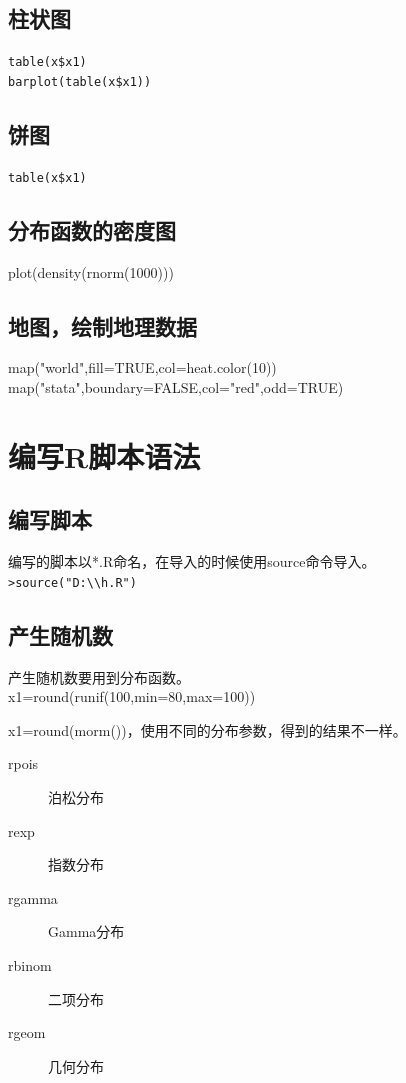 \documentclass[a4paper,12pt]{ctexbook}
\begin{document}
\begin{flushleft}
\subsection{柱状图}
\verb|table(x$x1)|\\
\verb|barplot(table(x$x1))|

\subsection{饼图}
\verb|table(x$x1)|

\subsection{分布函数的密度图}
plot(density(rnorm(1000)))

\subsection{地图，绘制地理数据}
map("world",fill=TRUE,col=heat.color(10))\\
map("stata",boundary=FALSE,col="red",odd=TRUE)


\section{编写R脚本语法}
\subsection{编写脚本}
编写的脚本以*.R命名，在导入的时候使用source命令导入。\\
\verb|>source("D:\\h.R")|

\subsection{产生随机数}
产生随机数要用到分布函数。\\
x1=round(runif(100,min=80,max=100))

x1=round(morm())，使用不同的分布参数，得到的结果不一样。
\begin{description}
	\item[rpois] 泊松分布
	\item[rexp] 指数分布
	\item[rgamma] Gamma分布
	\item[rbinom] 二项分布
	\item[rgeom] 几何分布
\end{description}


\end{flushleft}
\end{document}

